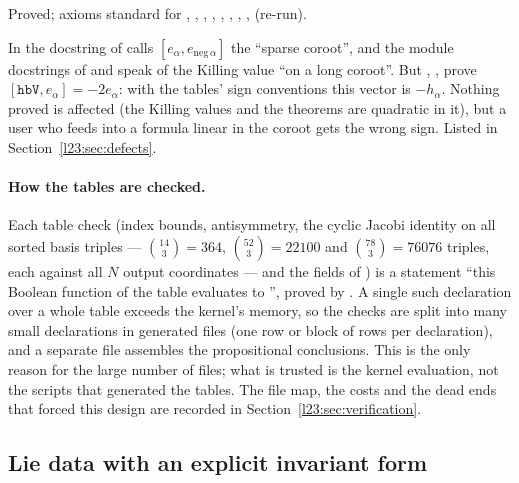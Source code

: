 \begin{status}
Proved; axioms standard for , , , ,
, , , ,  (re-run).
\end{status}

\begin{warning}[title={Trap: \texttt{hbV} is minus the standard coroot}]\label{l23:warn:hbvsign}
In  the docstring of  calls $[e_\alpha,e_{\mathrm{neg}\,\alpha}]$ the ``sparse coroot'', and the module
docstrings of  and  speak of the Killing value ``on a long coroot''. But ,
,  prove $[\mathtt{hbV},e_\alpha]=-2e_\alpha$: with the tables' sign conventions this vector is $-h_\alpha$.
Nothing proved is affected (the Killing values and the  theorems are quadratic in it), but a user who feeds 
into a formula linear in the coroot gets the wrong sign. Listed in Section~\ref{l23:sec:defects}.
\end{warning}

\paragraph{How the tables are checked.} Each table check (index bounds, antisymmetry, the cyclic Jacobi identity on all sorted basis
triples --- $\binom{14}{3}=364$, $\binom{52}{3}=22100$ and $\binom{78}{3}=76076$ triples, each against all $N$ output coordinates ---
and the fields of ) is a statement ``this Boolean function of the table evaluates to '', proved by
. A single such declaration over a whole table exceeds the kernel's memory, so the checks are split into many small
declarations in generated files (one row or block of rows per declaration), and a separate file assembles the propositional
conclusions. This is the only reason for the large number of files; what is trusted is the kernel evaluation, not the scripts that
generated the tables. The file map, the costs and the dead ends that forced this design are recorded in
Section~\ref{l23:sec:verification}.

\subsection{Lie data with an explicit invariant form}

